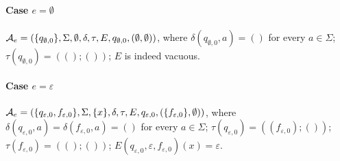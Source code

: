 %  








\paragraph{Case $e =\emptyset$} $\mathcal{A}_e = (\{q_{\emptyset, 0}\}, \Sigma, \emptyset, \delta, \tau, E, q_{\emptyset, 0}, (\emptyset, \emptyset))$, where $\delta(q_{\emptyset, 0}, a) = ()$ for every $a \in \Sigma$; $\tau(q_{\emptyset, 0}) = ((); ())$; $E$ is indeed vacuous.
		

\paragraph{Case $e = \varepsilon$} $\mathcal{A}_e = (\{q_{\varepsilon, 0}, f_{\varepsilon,0}\}, \Sigma, \{x \}, \delta, \tau, E, q_{\varepsilon,0}, (\{f_{\varepsilon,0}\}, \emptyset))$, 
%
where $\delta(q_{\varepsilon,0}, a) = \delta(f_{\varepsilon,0}, a) = ()$ for every $a \in \Sigma$; $\tau(q_{\varepsilon,0}) = ((f_{\varepsilon,0}); ())$;  $\tau(f_{\varepsilon,0}) = ((); ())$; %
$E(q_{\varepsilon,0}, \varepsilon, f_{\varepsilon,0})(x) = \varepsilon$.
		
